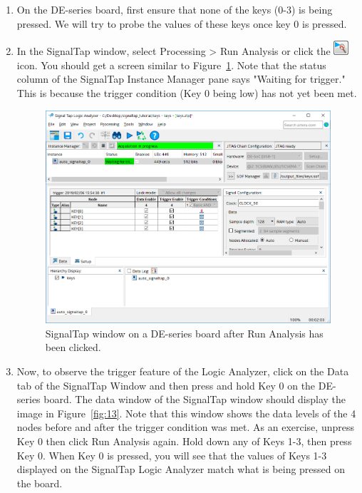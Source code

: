 \documentclass[11pt, twoside, pdftex]{article}
\begin{document}
\begin{enumerate}

\item On the DE-series board, first ensure that none of the keys (0-3) is being pressed. We will try to probe the values of these keys once key 0 is pressed.

\item In the SignalTap window, select {\sf Processing > Run Analysis} or click the \includegraphics[scale=0.7]{figures/icon1.png} icon. You should get a screen similar to Figure~\ref{fig:12}. Note that the status column of the SignalTap Instance Manager pane says "Waiting for
trigger." This is because the trigger condition (Key 0 being low) has not yet been met.
  
\begin{figure}[H]
   \begin{center}
      \includegraphics[scale=0.65]{figures/figure12.png}
   \caption{SignalTap window on a DE-series board after Run Analysis has been clicked.} 
	 \label{fig:12}
	 \end{center}
\end{figure}

\item Now, to observe the trigger feature of the Logic Analyzer, click
on the {\sf Data} tab of the SignalTap Window and then press and hold Key 0 on the DE-series board. The data window
of the SignalTap window should display the image in Figure~\ref{fig:13}. Note that this window shows the data levels
of the 4 nodes before and after the trigger condition was met. As an exercise, unpress Key 0 then click {\sf Run Analysis} again. Hold down any of Keys 1-3, then press Key 0. When Key 0 is pressed, you will see that the values of Keys 1-3
displayed on the SignalTap Logic Analyzer match what is being pressed on the board.
  
\end{enumerate}
\end{document}
